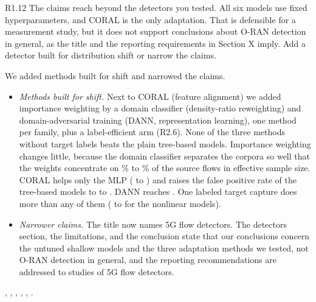 \label{rv:R1.12}
\begin{concern}{R1.12}
The claims reach beyond the detectors you tested. All six models use fixed hyperparameters, and CORAL is the only adaptation. That is defensible for a measurement study, but it does not support conclusions about O-RAN detection in general, as the title and the reporting requirements in Section X imply. Add a detector built for distribution shift or narrow the claims.
\end{concern}
\response We added methods built for shift and narrowed the claims.
\begin{itemize}[leftmargin=*, itemsep=1pt]
\item \emph{Methods built for shift.} Next to CORAL (feature alignment) we added importance weighting by a domain classifier (density-ratio reweighting) and domain-adversarial training (DANN, representation learning), one method per family, plus a label-efficient arm (R2.6). None of the three methods without target labels beats the plain tree-based models. Importance weighting changes little, because the domain classifier separates the corpora so well that the weights concentrate on \RIwESSmin\% to \RIwESSmax\% of the source flows in effective sample size. CORAL helps only the MLP (\RArmPlainMLPClean{} to \RArmCoralMLPClean) and raises the false positive rate of the tree-based models to \RArmCoralTreeFPRmin{} to \RArmCoralTreeFPRmax. DANN reaches \RArmDannDANNClean. One labeled target capture does more than any of them (\RLeSrcOneNlMin{} to \RLeSrcOneNlMax{} for the nonlinear models).
\item \emph{Narrower claims.} The title now names 5G flow detectors. The detectors section, the limitations, and the conclusion state that our conclusions concern the untuned shallow models and the three adaptation methods we tested, not O-RAN detection in general, and the reporting recommendations are addressed to studies of 5G flow detectors.
\end{itemize}

\action {}, , , , , .
